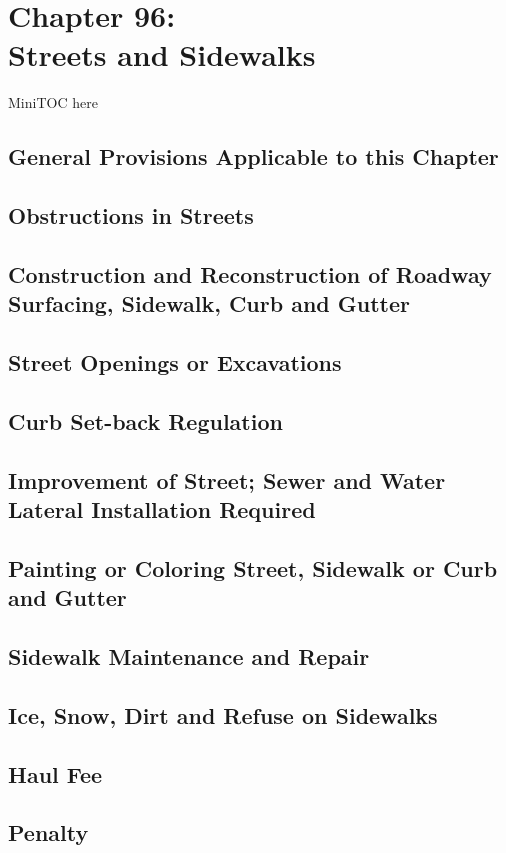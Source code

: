 
%
\chapter*{Chapter 96: \\
	Streets and Sidewalks}

MiniTOC here
\pagebreak
\section{General Provisions Applicable to this Chapter}
\section{Obstructions in Streets}
\section{Construction and Reconstruction of Roadway Surfacing, Sidewalk, Curb and Gutter}
\section{Street Openings or Excavations}
\section{Curb Set-back Regulation}
\section{Improvement of Street; Sewer and Water Lateral Installation Required}
\section{Painting or Coloring Street, Sidewalk or Curb and Gutter}
\section{Sidewalk Maintenance and Repair}
\section{Ice, Snow, Dirt and Refuse on Sidewalks}
\section{Haul Fee}

\setcounter{section}{98}
\section{Penalty}

%
